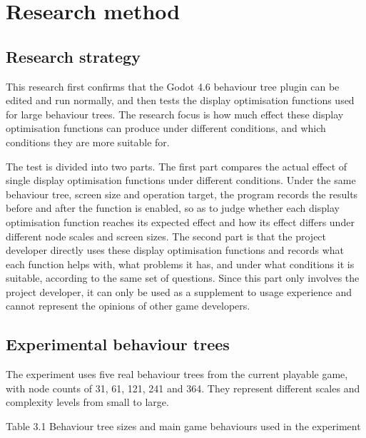 \chapter{Research method}

\section{Research strategy}

This research first confirms that the Godot 4.6 behaviour tree plugin can be edited and run normally, and then tests the display optimisation functions used for large behaviour trees. The research focus is how much effect these display optimisation functions can produce under different conditions, and which conditions they are more suitable for.

The test is divided into two parts. The first part compares the actual effect of single display optimisation functions under different conditions. Under the same behaviour tree, screen size and operation target, the program records the results before and after the function is enabled, so as to judge whether each display optimisation function reaches its expected effect and how its effect differs under different node scales and screen sizes. The second part is that the project developer directly uses these display optimisation functions and records what each function helps with, what problems it has, and under what conditions it is suitable, according to the same set of questions. Since this part only involves the project developer, it can only be used as a supplement to usage experience and cannot represent the opinions of other game developers.

\section{Experimental behaviour trees}

The experiment uses five real behaviour trees from the current playable game, with node counts of 31, 61, 121, 241 and 364. They represent different scales and complexity levels from small to large.

Table 3.1 Behaviour tree sizes and main game behaviours used in the experiment


